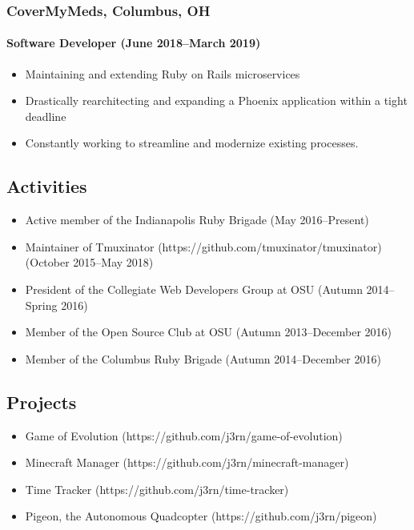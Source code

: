 \documentclass[]{article}
\begin{document}
\subsubsection*{CoverMyMeds, Columbus, OH}
\paragraph*{Software Developer (June 2018--March 2019)}
\begin{itemize}
\item Maintaining and extending Ruby on Rails microservices
\item Drastically rearchitecting and expanding a Phoenix application within a tight deadline
\item Constantly working to streamline and modernize existing processes.
\end{itemize}

\subsection*{Activities}
\begin{itemize}
\item Active member of the Indianapolis Ruby Brigade (May 2016--Present)
\item Maintainer of Tmuxinator (https://github.com/tmuxinator/tmuxinator) (October 2015--May 2018)
\item President of the Collegiate Web Developers Group at OSU (Autumn 2014--Spring 2016)
\item Member of the Open Source Club at OSU (Autumn 2013--December 2016)
\item Member of the Columbus Ruby Brigade (Autumn 2014--December 2016)
\end{itemize}

\subsection*{Projects}
\begin{itemize}
\item Game of Evolution (https://github.com/j3rn/game-of-evolution)
\item Minecraft Manager (https://github.com/j3rn/minecraft-manager)
\item Time Tracker (https://github.com/j3rn/time-tracker)
\item Pigeon, the Autonomous Quadcopter (https://github.com/j3rn/pigeon)
\end{itemize}
\end{document}
